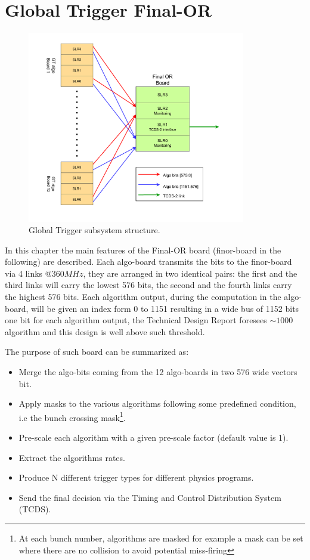 \documentclass[../../main.tex]{subfiles}
\begin{document}
\chapter{Global Trigger Final-OR}
\label{sec:Finor}

\begin{figure}[h]
    \centering
    \includegraphics[width=0.85\textwidth]{sections/06/Images/GT_layout.pdf}
    \caption{Global Trigger subsystem structure.}
    \label{fig:GT_layout-finor}
\end{figure}

In this chapter the main features of the Final-OR board (finor-board in the following) are described.  
Each algo-board transmits the bits to the finor-board via 4 links @$360MHz$, they are arranged in two identical pairs: the first and the third links will carry the lowest 576 bits, the second and the fourth links carry the highest 576 bits. Each algorithm output, during the computation in the algo-board, will be given an index form 0 to 1151 resulting in a wide bus of 1152 bits one bit for each algorithm output, the Technical Design Report foresees $\sim1000$ algorithm and this design is well above such threshold. 

The purpose of such board can be summarized as:
\begin{itemize}
    \item Merge the algo-bits coming from the 12 algo-boards in two 576 wide vectors bit.
    \item Apply masks to the various algorithms following some predefined condition, i.e the bunch crossing mask\footnote{At each bunch number, algorithms are masked for example a mask can be set where there are no collision to avoid potential miss-firing}.
    \item Pre-scale each algorithm with a given pre-scale factor (default value is 1).
    \item Extract the algorithms rates.
    \item Produce N different trigger types for different physics programs.
    \item Send the final decision via the Timing and Control Distribution System (TCDS).
\end{itemize}
\end{document}
